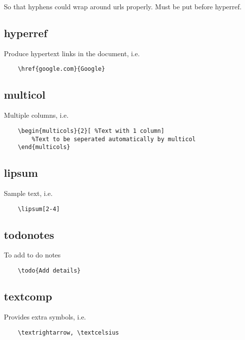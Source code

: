 \documentclass{article}
\begin{document}
So that hyphens could wrap around urls properly. Must be put before hyperref.

\subsection{hyperref}

Produce hypertext links in the document, i.e.

\begin{verbatim}
	\href{google.com}{Google}
\end{verbatim} 

\subsection{multicol}

Multiple columns, i.e.

\begin{verbatim}
	\begin{multicols}{2}[ %Text with 1 column]	
		%Text to be seperated automatically by multicol 
	\end{multicols}
\end{verbatim}

\subsection{lipsum}

Sample text, i.e.

\begin{verbatim}
	\lipsum[2-4]
\end{verbatim}

\subsection{todonotes}

To add to do notes

\begin{verbatim}
	\todo{Add details} 
\end{verbatim}

\subsection{textcomp}

Provides extra symbols, i.e.

\begin{verbatim}
	\textrightarrow, \textcelsius
\end{verbatim}
\end{document}

